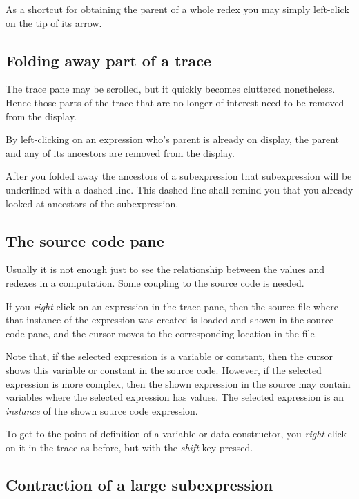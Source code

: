\documentclass[12pt]{article}
\begin{document}
As a shortcut for obtaining the parent of a whole redex you may simply left-click on the tip of its arrow.


\subsection{Folding away part of a trace}

The trace pane may be scrolled, but it quickly becomes cluttered nonetheless. Hence those parts of the trace that are no longer of interest need to be removed from the display.

By left-clicking on an expression who's parent is already on display,
the parent and any of its ancestors are removed from the display.

After you folded away the ancestors of a subexpression that subexpression will be underlined with a dashed line. This dashed line shall remind you that you already looked at ancestors of the subexpression.


\subsection{The source code pane}\label{source}

Usually it is not enough just to see the relationship between the values and redexes in a computation. Some coupling to the source code is needed.

If you \emph{right}-click on an expression in the trace pane, then the source file where that instance of the expression was created is loaded and shown in the source code pane, and the cursor moves to the corresponding location in the file.

Note that, if the selected expression is a variable or constant, then the cursor shows this variable or constant in the source code. However, if the selected expression is more complex, then the shown expression in the source may contain variables where the selected expression has values. The selected expression is an \emph{instance} of the shown source code expression.

To get to the point of definition of a variable or data constructor, you \emph{right}-click on it in the trace as before, but with the \emph{shift} key pressed.


\subsection{Contraction of a large subexpression}
\end{document}
